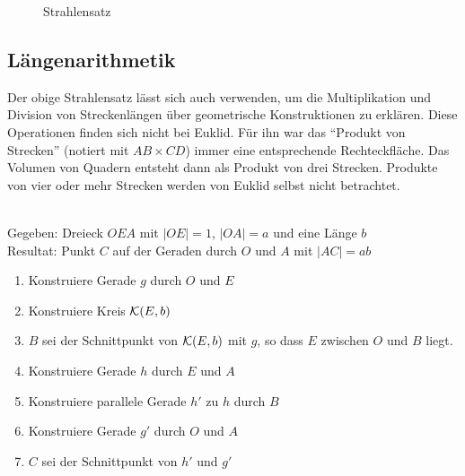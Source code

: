 \begin{center}
    \begin{figure}[h]
        
        \caption{Strahlensatz}
    \end{figure}
\end{center}

\subsection*{Längenarithmetik}

Der obige Strahlensatz lässt sich auch verwenden, um die Multiplikation und Division von
Streckenlängen über geometrische Konstruktionen zu erklären. Diese Operationen finden sich nicht
bei Euklid. Für ihn war das "`Produkt von Strecken"' (notiert mit $AB \times CD$)
immer eine entsprechende Rechteckfläche. Das Volumen von Quadern entsteht dann als Produkt von drei
Strecken. Produkte von vier oder mehr Strecken werden von Euklid selbst nicht betrachtet.

\begin{konst}\ \\
    Gegeben: Dreieck $OEA$ mit $|OE|=1$, $|OA|=a$ und eine Länge $b$\\
    Resultat: Punkt $C$ auf der Geraden durch $O$ und $A$ mit $|AC|=ab$
    \renewcommand{\labelenumi}{\arabic{enumi}.} %
    \begin{enumerate}
        \item Konstruiere Gerade $g$ durch $O$ und $E$
        \item Konstruiere Kreis ${\mathcal K}(E,b)$
        \item $B$ sei der Schnittpunkt von ${\mathcal K}(E,b)$ mit $g$, so dass $E$ zwischen $O$ und $B$
            liegt.
        \item Konstruiere Gerade $h$ durch $E$ und $A$
        \item Konstruiere parallele Gerade $h'$ zu $h$ durch $B$
        \item Konstruiere Gerade $g'$ durch $O$ und $A$
        \item $C$ sei der Schnittpunkt von $h'$ und $g'$
    \end{enumerate}
\end{konst}

